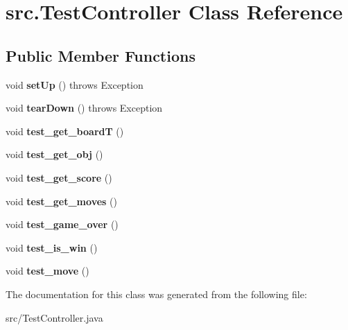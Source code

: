 \hypertarget{classsrc_1_1TestController}{}\section{src.\+Test\+Controller Class Reference}
\label{classsrc_1_1TestController}
\subsection*{Public Member Functions}
\begin{DoxyCompactItemize}
\item 
\mbox{\label{classsrc_1_1TestController_ab129a4213f0ea77429d43101909240d9}} 
void {\bfseries set\+Up} ()  throws Exception 
\item 
\mbox{\label{classsrc_1_1TestController_a151cca5b37f8dd3d56217f9f4aa25f97}} 
void {\bfseries tear\+Down} ()  throws Exception 
\item 
\mbox{\label{classsrc_1_1TestController_a1eb8136907c7884b8cd43e97d46daaa6}} 
void {\bfseries test\+\_\+get\+\_\+boardT} ()
\item 
\mbox{\label{classsrc_1_1TestController_afec72ec4ab7ede6892f1914674be43f7}} 
void {\bfseries test\+\_\+get\+\_\+obj} ()
\item 
\mbox{\label{classsrc_1_1TestController_a9576c15b000122e38e483576de4657b0}} 
void {\bfseries test\+\_\+get\+\_\+score} ()
\item 
\mbox{\label{classsrc_1_1TestController_a2726137e686a86c27dac6a285f642f5b}} 
void {\bfseries test\+\_\+get\+\_\+moves} ()
\item 
\mbox{\label{classsrc_1_1TestController_a4b1cc732b05409677bdc8598481f4cd4}} 
void {\bfseries test\+\_\+game\+\_\+over} ()
\item 
\mbox{\label{classsrc_1_1TestController_a5d91d7d171df853cf99e1ab9d23a16b9}} 
void {\bfseries test\+\_\+is\+\_\+win} ()
\item 
\mbox{\label{classsrc_1_1TestController_ae542e70a24eb79e4beda22c5be3f44c2}} 
void {\bfseries test\+\_\+move} ()
\end{DoxyCompactItemize}


The documentation for this class was generated from the following file\+:\begin{DoxyCompactItemize}
\item 
src/Test\+Controller.\+java\end{DoxyCompactItemize}
